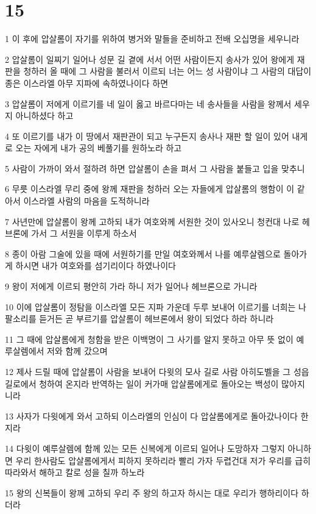 \chapter{15}

\par 1 이 후에 압살롬이 자기를 위하여 병거와 말들을 준비하고 전배 오십명을 세우니라
\par 2 압살롬이 일찌기 일어나 성문 길 곁에 서서 어떤 사람이든지 송사가 있어 왕에게 재판을 청하러 올 때에 그 사람을 불러서 이르되 너는 어느 성 사람이냐 그 사람의 대답이 종은 이스라엘 아무 지파에 속하였나이다 하면
\par 3 압살롬이 저에게 이르기를 네 일이 옳고 바르다마는 네 송사들을 사람을 왕께서 세우지 아니하셨다 하고
\par 4 또 이르기를 내가 이 땅에서 재판관이 되고 누구든지 송사나 재판 할 일이 있어 내게로 오는 자에게 내가 공의 베풀기를 원하노라 하고
\par 5 사람이 가까이 와서 절하려 하면 압살롬이 손을 펴서 그 사람을 붙들고 입을 맞추니
\par 6 무릇 이스라엘 무리 중에 왕께 재판을 청하러 오는 자들에게 압살롬의 행함이 이 같아서 이스라엘 사람의 마음을 도적하니라
\par 7 사년만에 압살롬이 왕께 고하되 내가 여호와께 서원한 것이 있사오니 청컨대 나로 헤브론에 가서 그 서원을 이루게 하소서
\par 8 종이 아람 그술에 있을 때에 서원하기를 만일 여호와께서 나를 예루살렘으로 돌아가게 하시면 내가 여호와를 섬기리이다 하였나이다
\par 9 왕이 저에게 이르되 평안히 가라 하니 저가 일어나 헤브론으로 가니라
\par 10 이에 압살롬이 정탐을 이스라엘 모든 지파 가운데 두루 보내어 이르기를 너희는 나팔소리를 듣거든 곧 부르기를 압살롬이 헤브론에서 왕이 되었다 하라 하니라
\par 11 그 때에 압살롬에게 청함을 받은 이백명이 그 사기를 알지 못하고 아무 뜻 없이 예루살렘에서 저와 함께 갔으며
\par 12 제사 드릴 때에 압살롬이 사람을 보내어 다윗의 모사 길로 사람 아히도벨을 그 성읍 길로에서 청하여 온지라 반역하는 일이 커가매 압살롬에게로 돌아오는 백성이 많아지니라
\par 13 사자가 다윗에게 와서 고하되 이스라엘의 인심이 다 압살롬에게로 돌아갔나이다 한지라
\par 14 다윗이 예루살렘에 함께 있는 모든 신복에게 이르되 일어나 도망하자 그렇지 아니하면 우리 한사람도 압살롬에게서 피하지 못하리라 빨리 가자 두렵건대 저가 우리를 급히 따라와서 해하고 칼로 성을 칠까 하노라
\par 15 왕의 신복들이 왕께 고하되 우리 주 왕의 하고자 하시는 대로 우리가 행하리이다 하더라
